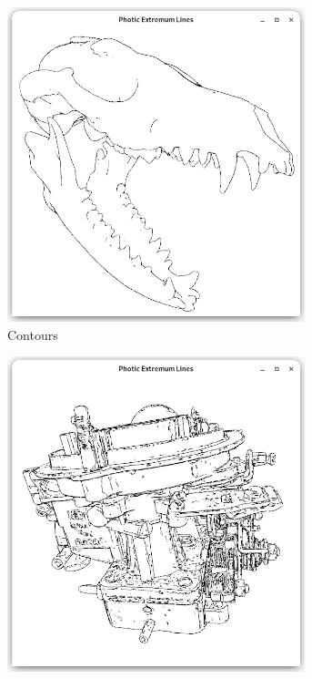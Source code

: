 \documentclass[9pt,fleqn,twoside,twocolumn]{stdglobal}
\begin{document}
\begin{figure}
\begin{subfigure}[t]{0.19\textwidth}
        \includegraphics[width=0.95\textwidth,trim={15px 15 15 50},clip]{images/results/skull-contours.png}
        \caption{Contours}
      \end{subfigure}%
      \hfill%
      \begin{subfigure}[t]{0.19\textwidth}
        \centering
        \includegraphics[width=0.95\textwidth,trim={15px 15 15 50},clip]{images/results/carburetor-pel.png}

\end{subfigure}
\end{figure}
\end{document}

